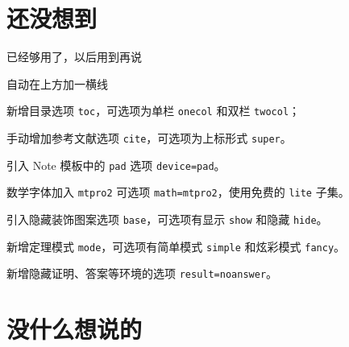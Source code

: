 \documentclass[lang=cn,newtx,10pt,scheme=chinese]{elegantbook}
\begin{document}
\chapter{还没想到}

已经够用了，以后用到再说

自动在上方加一横线


\begin{change}
  \item 新增目录选项 \lstinline{toc}，可选项为单栏 \lstinline{onecol} 和双栏 \lstinline{twocol}；
  \item 手动增加参考文献选项 \lstinline{cite}，可选项为上标形式 \lstinline{super}。
  \item 引入 Note 模板中的 \lstinline{pad} 选项 \lstinline{device=pad}。
  \item 数学字体加入 \lstinline{mtpro2} 可选项 \lstinline{math=mtpro2}，使用免费的 \lstinline{lite} 子集。
  \item 引入隐藏装饰图案选项 \lstinline{base}，可选项有显示 \lstinline{show} 和隐藏 \lstinline{hide}。
  \item 新增定理模式 \lstinline{mode}，可选项有简单模式 \lstinline{simple} 和炫彩模式 \lstinline{fancy}。
  \item 新增隐藏证明、答案等环境的选项 \lstinline{result=noanswer}。
\end{change}

\nocite{*}
\printbibliography[heading=bibintoc, title=\ebibname]

\appendix 

\chapter{没什么想说的}

	
\end{document}
